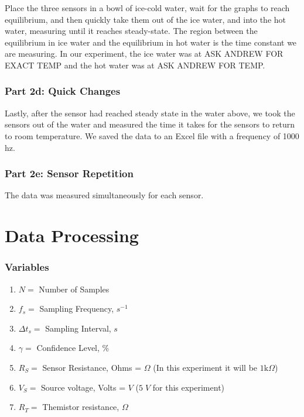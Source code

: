 \documentclass{article}
\begin{document}
Place the three sensors in a bowl of ice-cold water, wait for the graphs to reach equilibrium, and then quickly take them out of the ice water, and into the hot water, measuring until it reaches steady-state.  The region between the equilibrium in ice water and the equilibrium in hot water is the time constant we are measuring.  In our experiment, the ice water was at ASK ANDREW FOR EXACT TEMP and the hot water was at ASK ANDREW FOR TEMP.  

\subsubsection{Part 2d: Quick Changes} %

Lastly, after the sensor had reached steady state in the water above, we took the sensors out of the water and measured the time it takes for the sensors to return to room temperature. We saved the data to an Excel file with a frequency of 1000 hz. 

\subsubsection{Part 2e: Sensor Repetition} %

The data was measured simultaneously for each sensor.  

\section{Data Processing}
\subsubsection*{Variables}
\begin{enumerate}[label = \roman*.]
    \item \(N = \) Number of Samples
    \item \(f_{s} = \) Sampling Frequency, $s^{-1}$
    \item \(\Delta t_{s} = \) Sampling Interval, $s$
    \item \(\gamma = \) Confidence Level, \%
    \item \(R_{S} = \) Sensor Resistance, Ohms = $\Omega$ (In this experiment it will be $1\text{k}\Omega$)
    \item \(V_{S} = \) Source voltage, Volts = $V$ ($5\;V$ for this experiment)
    \item \(R_{T} = \) Themistor resistance, $\Omega$
\end{enumerate}
\end{document}
